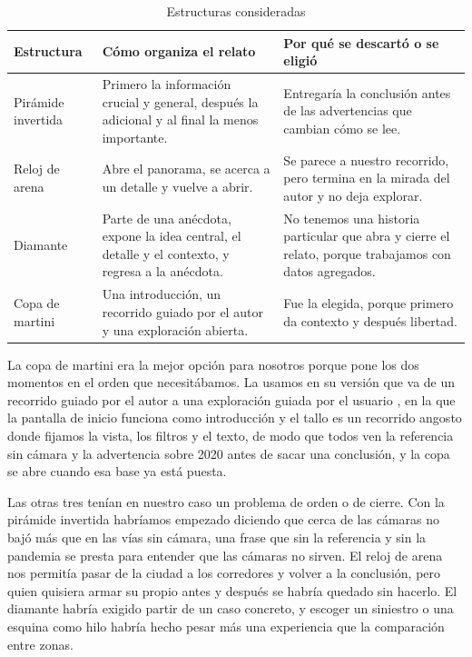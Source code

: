 \documentclass[10pt,a4paper]{article}
\begin{document}
\begin{table}[!htbp]\centering\small
\begin{tabularx}{\linewidth}{P{2.8cm}LL}
\toprule
\textbf{Estructura} & \textbf{Cómo organiza el relato} & \textbf{Por qué se descartó o se eligió}\\
\midrule
Pirámide invertida & Primero la información crucial y general, después la adicional y al final la menos importante. & Entregaría la conclusión antes de las advertencias que cambian cómo se lee.\\
Reloj de arena & Abre el panorama, se acerca a un detalle y vuelve a abrir. & Se parece a nuestro recorrido, pero termina en la mirada del autor y no deja explorar.\\
Diamante & Parte de una anécdota, expone la idea central, el detalle y el contexto, y regresa a la anécdota. & No tenemos una historia particular que abra y cierre el relato, porque trabajamos con datos agregados.\\
Copa de martini & Una introducción, un recorrido guiado por el autor y una exploración abierta. & Fue la elegida, porque primero da contexto y después libertad.\\
\bottomrule
\end{tabularx}
\caption{Estructuras consideradas}
\end{table}

La copa de martini era la mejor opción para nosotros porque pone los dos momentos en el orden que necesitábamos. La usamos en su versión que va de un recorrido guiado por el autor a una exploración guiada por el usuario \cite{segel}, en la que la pantalla de inicio funciona como introducción y el tallo es un recorrido angosto donde fijamos la vista, los filtros y el texto, de modo que todos ven la referencia sin cámara y la advertencia sobre 2020 antes de sacar una conclusión, y la copa se abre cuando esa base ya está puesta.

Las otras tres tenían en nuestro caso un problema de orden o de cierre. Con la pirámide invertida habríamos empezado diciendo que cerca de las cámaras no bajó más que en las vías sin cámara, una frase que sin la referencia y sin la pandemia se presta para entender que las cámaras no sirven. El reloj de arena nos permitía pasar de la ciudad a los corredores y volver a la conclusión, pero quien quisiera armar su propio antes y después se habría quedado sin hacerlo. El diamante habría exigido partir de un caso concreto, y escoger un siniestro o una esquina como hilo habría hecho pesar más una experiencia que la comparación entre zonas.
\end{document}
